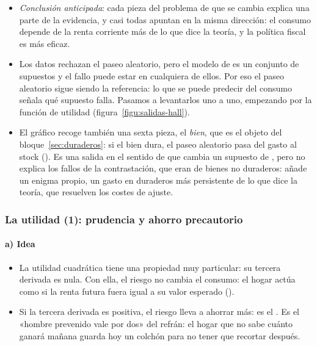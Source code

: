 \documentclass[11pt]{article}
\begin{document}
\begin{itemize}
\item \emph{Conclusión anticipada}: cada pieza del problema de  que se cambia explica una parte de la evidencia, y casi todas apuntan en la misma dirección: el consumo depende de la renta corriente más de lo que dice la teoría, y la política fiscal es más eficaz.
\item Los datos rechazan el paseo aleatorio, pero el modelo de  es un conjunto de supuestos y el fallo puede estar en cualquiera de ellos. Por eso el paseo aleatorio sigue siendo la referencia: lo que se puede predecir del consumo señala qué supuesto falla. Pasamos a levantarlos uno a uno, empezando por la función de utilidad (figura~\ref{figu:salidas-hall}).
\item El gráfico recoge también una sexta pieza, el \emph{bien}, que es el objeto del bloque~\ref{sec:duraderos}: si el bien dura, el paseo aleatorio pasa del gasto al stock (). Es una salida en el sentido de que cambia un supuesto de , pero no explica los fallos de la contrastación, que eran de bienes no duraderos: añade un enigma propio, un gasto en duraderos más persistente de lo que dice la teoría, que resuelven los costes de ajuste.
\end{itemize}

\begin{infografia}[H]
\centering
\caption{Las salidas al modelo de : qué pieza se cambia y qué explica}\label{figu:salidas-hall}
\end{infografia}

\subsubsection{La utilidad (1): prudencia y ahorro precautorio}\label{sec:precautorio}

\paragraph{a) Idea}

\begin{itemize}
\item La utilidad cuadrática tiene una propiedad muy particular: su tercera derivada es nula. Con ella, el riesgo no cambia el consumo: el hogar actúa como si la renta futura fuera igual a su valor esperado ().
\item Si la tercera derivada es positiva, el riesgo lleva a ahorrar más: es el \nocite{Leland1968Saving,Sandmo1970Effect}. Es el «hombre prevenido vale por dos» del refrán: el hogar que no sabe cuánto ganará mañana guarda hoy un colchón para no tener que recortar después.
\end{itemize}
\end{document}
